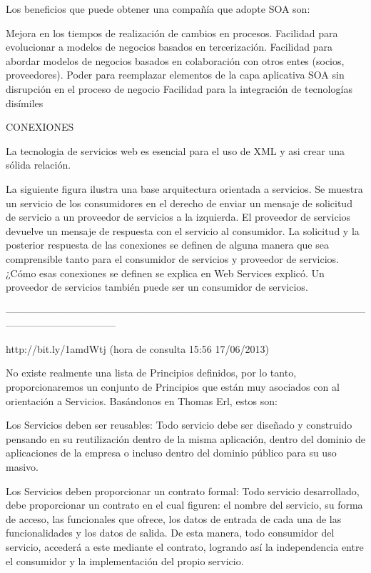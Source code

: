 Los beneficios que puede obtener una compañía que adopte SOA son:

    Mejora en los tiempos de realización de cambios en procesos.
    Facilidad para evolucionar a modelos de negocios basados en tercerización.
    Facilidad para abordar modelos de negocios basados en colaboración con otros entes (socios, proveedores).
    Poder para reemplazar elementos de la capa aplicativa SOA sin disrupción en el proceso de negocio
    Facilidad para la integración de tecnologías disímiles

CONEXIONES

La tecnologia de servicios web es esencial para el uso de XML y asi crear una sólida relación.

La siguiente figura ilustra una base arquitectura orientada a servicios. Se muestra un servicio de los consumidores en el derecho de 
enviar un mensaje de solicitud de servicio a un proveedor de servicios a la izquierda. El proveedor de servicios devuelve un mensaje 
de respuesta con el servicio al consumidor. La solicitud y la posterior respuesta de las conexiones se definen de alguna manera que 
sea comprensible tanto para el consumidor de servicios y proveedor de servicios. ¿Cómo esas conexiones se definen se explica en Web 
Services explicó. Un proveedor de servicios también puede ser un consumidor de servicios.

---------------------------------------------------------------------------------------------------------------------------------------------

http://bit.ly/1amdWtj (hora de consulta 15:56 17/06/2013)

No existe realmente una lista de Principios definidos, por lo tanto, proporcionaremos un conjunto de Principios que están muy asociados con al orientación a Servicios.
Basándonos en Thomas Erl, estos son:



    Los Servicios deben ser reusables: Todo servicio debe ser diseñado y construido pensando en su reutilización dentro de la misma 
    aplicación, dentro del dominio de aplicaciones de la empresa o incluso dentro del dominio público para su uso masivo.

    Los Servicios deben proporcionar un contrato formal: Todo servicio desarrollado, debe proporcionar un contrato en el cual figuren: 
    el nombre del servicio, su forma de acceso, las funcionales que ofrece, los datos de entrada de cada una de las funcionalidades y 
    los datos de salida. De esta manera, todo consumidor del servicio, accederá a este mediante el contrato, logrando así la independencia 
    entre el consumidor y la implementación del propio servicio.

